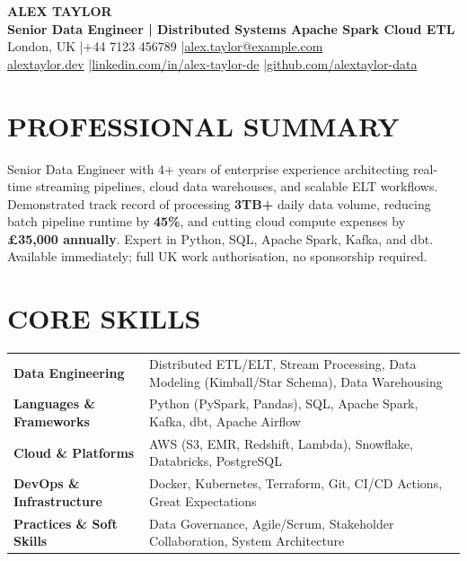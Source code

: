 \documentclass[11pt,a4paper]{article}
\begin{document}
\begin{center}
    {\Huge \textbf{ALEX TAYLOR}} \\ \vspace{6pt}
    {\large \textbf{Senior Data Engineer | Distributed Systems \textbullet{} Apache Spark \textbullet{} Cloud ETL}} \\ \vspace{8pt}
    London, UK \quad|\quad +44 7123 456789 \quad|\quad \href{mailto:alex.taylor@example.com}{alex.taylor@example.com} \\ \vspace{4pt}
    \href{https://alextaylor.dev}{alextaylor.dev} \quad|\quad \href{https://linkedin.com/in/alex-taylor-de}{linkedin.com/in/alex-taylor-de} \quad|\quad \href{https://github.com/alextaylor-data}{github.com/alextaylor-data}
\end{center}

\section*{PROFESSIONAL SUMMARY}
Senior Data Engineer with 4+ years of enterprise experience architecting real-time streaming pipelines, cloud data warehouses, and scalable ELT workflows. Demonstrated track record of processing \textbf{3TB+} daily data volume, reducing batch pipeline runtime by \textbf{45\%}, and cutting cloud compute expenses by \textbf{\pounds35,000 annually}. Expert in Python, SQL, Apache Spark, Kafka, and dbt. Available immediately; full UK work authorisation, no sponsorship required.

\section*{CORE SKILLS}
\begin{tabularx}{\textwidth}{@{}l X@{}}
\textbf{Data Engineering} & Distributed ETL/ELT, Stream Processing, Data Modeling (Kimball/Star Schema), Data Warehousing \\
\textbf{Languages \& Frameworks} & Python (PySpark, Pandas), SQL, Apache Spark, Kafka, dbt, Apache Airflow \\
\textbf{Cloud \& Platforms} & AWS (S3, EMR, Redshift, Lambda), Snowflake, Databricks, PostgreSQL \\
\textbf{DevOps \& Infrastructure} & Docker, Kubernetes, Terraform, Git, CI/CD Actions, Great Expectations \\
\textbf{Practices \& Soft Skills} & Data Governance, Agile/Scrum, Stakeholder Collaboration, System Architecture \\
\end{tabularx}
\end{document}
